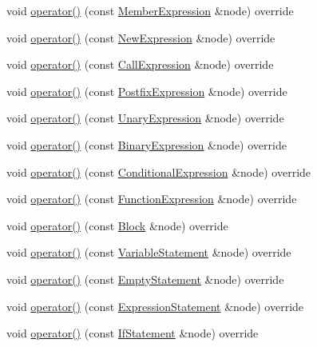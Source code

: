 \begin{DoxyCompactItemize}
void \hyperlink{struct_callable_visitor_a59d72c70fe06b87dfe5fdd9d53469ef2}{operator()} (const \hyperlink{struct_member_expression}{Member\+Expression} \&node) override
\item 
void \hyperlink{struct_callable_visitor_a2f9386232d6c45a5a15faf2a711895cd}{operator()} (const \hyperlink{struct_new_expression}{New\+Expression} \&node) override
\item 
void \hyperlink{struct_callable_visitor_a1cddd42d479e93e1a7e9693726e18dd5}{operator()} (const \hyperlink{struct_call_expression}{Call\+Expression} \&node) override
\item 
void \hyperlink{struct_callable_visitor_abc81c2b2a4765ac791bf6cd73ca97b9a}{operator()} (const \hyperlink{struct_postfix_expression}{Postfix\+Expression} \&node) override
\item 
void \hyperlink{struct_callable_visitor_a97c38a0a06a6f9ab527546060b518639}{operator()} (const \hyperlink{struct_unary_expression}{Unary\+Expression} \&node) override
\item 
void \hyperlink{struct_callable_visitor_ae926f418a357edc9dfebb0173b921029}{operator()} (const \hyperlink{struct_binary_expression}{Binary\+Expression} \&node) override
\item 
void \hyperlink{struct_callable_visitor_a239782df486cd64db0434955f114cb43}{operator()} (const \hyperlink{struct_conditional_expression}{Conditional\+Expression} \&node) override
\item 
void \hyperlink{struct_callable_visitor_ae27a0a08ee7eaa1956bd9e43da01ee4f}{operator()} (const \hyperlink{struct_function_expression}{Function\+Expression} \&node) override
\item 
void \hyperlink{struct_callable_visitor_a4ad3a74aae8cb9f1b4a8deb6d5738ccc}{operator()} (const \hyperlink{struct_block}{Block} \&node) override
\item 
void \hyperlink{struct_callable_visitor_a953a21e9aab73b9104355c2d04b3f79d}{operator()} (const \hyperlink{struct_variable_statement}{Variable\+Statement} \&node) override
\item 
void \hyperlink{struct_callable_visitor_a71422a8c5db1c1f6e73dd76638a2a47b}{operator()} (const \hyperlink{struct_empty_statement}{Empty\+Statement} \&node) override
\item 
void \hyperlink{struct_callable_visitor_ae09660080883ac12939e8b9581113e9c}{operator()} (const \hyperlink{struct_expression_statement}{Expression\+Statement} \&node) override
\item 
void \hyperlink{struct_callable_visitor_a5aaa91de3ead2c42bed03df3fa0de990}{operator()} (const \hyperlink{struct_if_statement}{If\+Statement} \&node) override

\end{DoxyCompactItemize}
